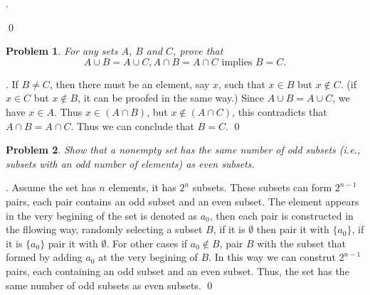 \documentclass[12pt]{article}
\newtheorem{hw}{Problem}
\newenvironment{sol}
{\par\vspace{3mm}\noindent{\it Solution}.}
{\qed}
\begin{document}
\begin{sol}
\begin{minipage}[h]{0.45\textwidth}
		\end{minipage}
		
	\end{sol}
	
	
	\begin{hw}
		For any sets $A$, $B$ and $C$, prove that $$A\cup B =A \cup C,  A\cap B = A\cap C  \text{~implies~}  B=C.$$
	\end{hw}
	\begin{sol}
		If $B \neq C$, then there must be an element, say $x$, such that $x \in B$ but $x \notin C$. (if $x \in C$ but $x \notin B$, it can be proofed in the same way.)  Since $A\cup B =A \cup C$, we have $x \in A$. Thus $x \in (A\cap B)$, but $x \notin (A \cap C)$, this contradicts that $A\cap B = A\cap C$. Thus we can conclude that $B = C$.
	\end{sol}
	
	
	\begin{hw}
		Show that a nonempty set has the same number of odd subsets (i.e., subsets with an odd number of elements) as even subsets.
	\end{hw}
	\begin{sol}
		Assume the set has $n$ elements, it has $2^{n}$ subsets. These subsets can form $2^{n-1}$ pairs, each pair contains an odd subset and an even subset. The element appears in the very begining of the set is denoted as $a_0$, then each pair is constructed in the fllowing way, randomly selecting a subset $B$, if it is $\emptyset$ then pair it with $\{a_0\}$, if it is $\{a_0\}$ pair it with $\emptyset$. For other cases if $a_0 \notin B$, pair $B$ with the subset that formed by adding $a_0$ at the very begining of $B$. In this way we can construt $2^{n-1}$ pairs, each containing an odd subset and an even subset. Thus, the set has the same number of odd subsets as even subsets.
	\end{sol}
	
\end{document}
